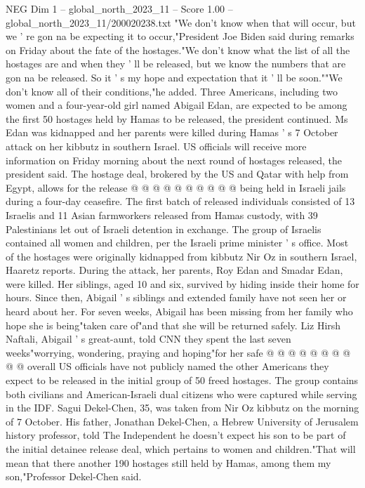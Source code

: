 \begin{textsample}{NEG Dim 1 – global\_north\_2023\_11 – Score 1.00 – global\_north\_2023\_11/200020238.txt}  \label{ex:f1_neg_106}
"We don't know when that will occur, but we ' re gon na be expecting it to occur,"President Joe Biden said during remarks on Friday about the fate of the hostages."We don't know what the list of all the hostages are and when they ' ll be released, but we know the numbers that are gon na be released.
So it ' s my hope and expectation that it ' ll be soon.""We don't know all of their conditions,"he added.
Three Americans, including two women and a four-year-old girl named Abigail Edan, are expected to be among the first 50 hostages held by Hamas to be released, the president continued.
Ms Edan was kidnapped and her parents were killed during Hamas ' s 7 October attack on her kibbutz in southern Israel.
US officials will receive more information on Friday morning about the next round of hostages released, the president said.
The hostage deal, brokered by the US and Qatar with help from Egypt, allows for the release @ @ @ @ @ @ @ @ @ @ being held in Israeli jails during a four-day ceasefire.
The first batch of released individuals consisted of 13 Israelis and 11 Asian farmworkers released from Hamas custody, with 39 Palestinians let out of Israeli detention in exchange.
The group of Israelis contained all women and children, per the Israeli prime minister ' s office.
Most of the hostages were originally kidnapped from kibbutz Nir Oz in southern Israel, Haaretz reports.
During the attack, her parents, Roy Edan and Smadar Edan, were killed.
Her siblings, aged 10 and six, survived by hiding inside their home for hours.
Since then, Abigail ' s siblings and extended family have not seen her or heard about her.
For seven weeks, Abigail has been missing from her family who hope she is being"taken care of"and that she will be returned safely.
Liz Hirsh Naftali, Abigail ' s great-aunt, told CNN they spent the last seven weeks"worrying, wondering, praying and hoping"for her safe @ @ @ @ @ @ @ @ @ @ overall US officials have not publicly named the other Americans they expect to be released in the initial group of 50 freed hostages.
The group contains both civilians and American-Israeli dual citizens who were captured while serving in the IDF.
Sagui Dekel-Chen, 35, was taken from Nir Oz kibbutz on the morning of 7 October.
His father, Jonathan Dekel-Chen, a Hebrew University of Jerusalem history professor, told The Independent he doesn't expect his son to be part of the initial detainee release deal, which pertains to women and children."That will mean that there another 190 hostages still held by Hamas, among them my son,"Professor Dekel-Chen said.

\end{textsample}

